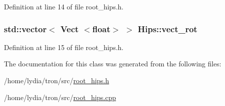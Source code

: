 Definition at line 14 of file root\+\_\+hips.\+h.

\hypertarget{class_hips_a704c04efaf11d71f44ee571a9ed1b6f7}{
\subsubsection[{vect\+\_\+rot}]{\setlength{\rightskip}{0pt plus 5cm}std\+::vector$<$ {\bf Vect} $<$float$>$ $>$ Hips\+::vect\+\_\+rot}}\label{class_hips_a704c04efaf11d71f44ee571a9ed1b6f7}


Definition at line 15 of file root\+\_\+hips.\+h.



The documentation for this class was generated from the following files\+:\begin{DoxyCompactItemize}
\item 
/home/lydia/tron/src/\hyperlink{root__hips_8h}{root\+\_\+hips.\+h}\item 
/home/lydia/tron/src/\hyperlink{root__hips_8cpp}{root\+\_\+hips.\+cpp}\end{DoxyCompactItemize}
